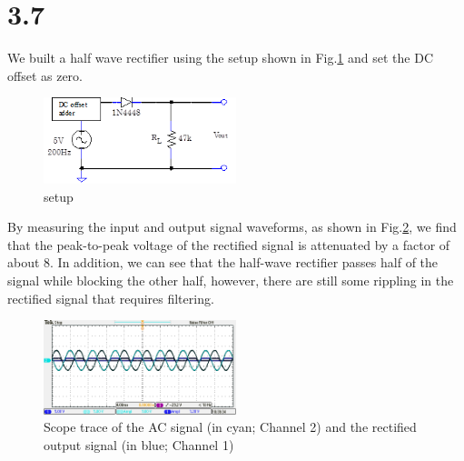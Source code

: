 \documentclass[authoryear, 12pt,5p, times]{elsarticle}
\begin{document}
\section*{3.7}\label{3_7_q}
We built a half wave rectifier using the setup shown in Fig.\ref{3_7_setup} and set the DC offset as zero. 
\begin{figure}[h!]
\center
\includegraphics[width=0.5\textwidth]{figure/3_7_setup}
\caption{ setup}
\label{3_7_setup}
\end{figure}
By measuring the input and output signal waveforms, as shown in Fig.\ref{3_7_trace}, we find that the peak-to-peak voltage of the rectified signal is attenuated by a factor of about 8. In addition, we can see that the half-wave rectifier passes half of the signal while blocking the other half, however, there are still some rippling in the rectified signal that requires filtering.
\begin{figure}[h!]
\center
\includegraphics[width=0.5\textwidth]{figure/3_7}
\caption{Scope trace of the AC signal (in cyan; Channel 2) and the rectified output signal (in blue; Channel 1)}
\label{3_7_trace}
\end{figure}
\end{document}
